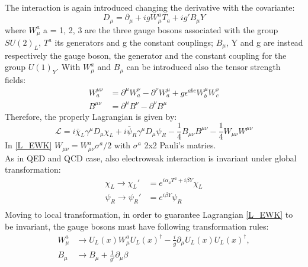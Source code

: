 The interaction is again introduced changing the derivative with the covariante:
\begin{equation}
D_{\mu} = \partial_{\mu} + igW_{\mu}^{a}T_{a} + ig'B_{\mu}Y
\label{D_EWK}
\end{equation}
where $W_{\mu}^{a}$ a = 1, 2, 3 are the three gauge bosons associated with the group $SU(2)_{L}$, $T^{a}$ its generators and g the constant couplings; $B_{\mu}$, Y and g are instead respectively the gauge boson, the generator and the constant coupling for the group $U(1)_{Y}$.
With $W_{\mu}^{a}$ and $B_{\mu}$ can be introduced also the tensor strength fields:
\begin{equation}
\begin{split}
W^{\mu\nu}_{a} &= \partial^{\mu}W^{\nu}_{a} - \partial^{\nu}W^{\mu}_{a} + g\epsilon^{abc}W^{\mu}_{b}W^{\nu}_{c} \\
B^{\mu\nu} 	 &= \partial^{\mu}B^{\nu} - \partial^{\nu}B^{\mu}
\label{WB_munu}
\end{split}
\end{equation}
Therefore, the properly Lagrangian is given by:
\begin{equation}
\mathcal{L} = i\bar{\chi}_{L}\gamma^{\mu}D_{\mu}\chi_{L} + i\bar{\psi}_{R}\gamma^{\mu}D_{\mu}\psi_{R} - \frac{1}{4}B_{\mu\nu}B^{\mu\nu} - \frac{1}{4}W_{\mu\nu}W^{\mu\nu}
\label{L_EWK}
\end{equation}
In \ref{L_EWK} $W_{\mu\nu} = W^{a}_{\mu\nu}\sigma^{a}/2$ with $\sigma^{a}$ 2x2 Pauli's matries. \\
As in QED and QCD case, also electroweak interaction is invariant under global transformation:
\begin{equation}
\begin{split}
\chi_{L} \to \chi_{L}' &= e^{i\alpha_{a} T^{a}  + i\beta Y} \chi_{L} \\
\psi_{R} \to \psi_{R}' &= e^{i\beta Y} \psi_{R} \\
\label{EWK_global}
\end{split}
\end{equation}
Moving to local transformation, in order to guarantee Lagrangian \ref{L_EWK} to be invariant, the gauge bosons must have following transformation rules:
\begin{equation}
\begin{split}
W^{a}_{\mu} &\to U_{L}(x) W^{a}_{\mu}  U_{L}(x)^{\dagger} - \frac{i}{g}\partial_{\mu}U_{L}(x) U_{L}(x)^{\dagger}, \\
B_{\mu} &\to B_{\mu} + \frac{1}{g'}\partial_{\mu}\beta
\label{EWK_global}
\end{split}
\end{equation}

